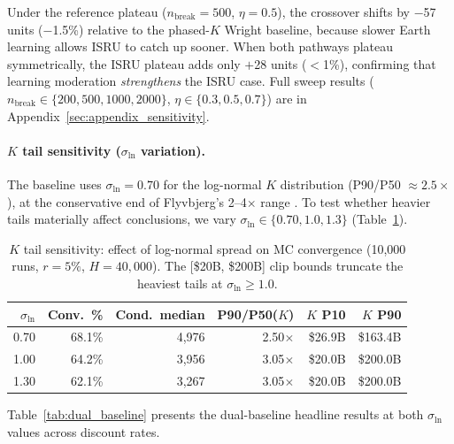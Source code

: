\documentclass[preprint,12pt]{elsarticle}
\begin{document}
Under the reference plateau ($n_{\mathrm{break}} = 500$, $\eta = 0.5$), the crossover shifts by $-$57 units ($-$1.5\%) relative to the phased-$K$ Wright baseline, because slower Earth learning allows ISRU to catch up sooner. When both pathways plateau symmetrically, the ISRU plateau adds only $+$28 units ($<$1\%), confirming that learning moderation \emph{strengthens} the ISRU case. Full sweep results ($n_{\mathrm{break}} \in \{200,500,1000,2000\}$, $\eta \in \{0.3,0.5,0.7\}$) are in Appendix~\ref{sec:appendix_sensitivity}.

\paragraph{$K$ tail sensitivity ($\sigma_{\ln}$ variation).} The baseline uses $\sigma_{\ln} = 0.70$ for the log-normal $K$ distribution (P90/P50 $\approx 2.5\times$), at the conservative end of Flyvbjerg's 2--4$\times$ range \cite{flyvbjerg2014}. To test whether heavier tails materially affect conclusions, we vary $\sigma_{\ln} \in \{0.70, 1.0, 1.3\}$ (Table~\ref{tab:sigma_ln}).

\begin{table}[htbp]
\centering
\caption{$K$ tail sensitivity: effect of log-normal spread on MC convergence (10{,}000 runs, $r = 5\%$, $H = 40{,}000$). The [\$20B, \$200B] clip bounds truncate the heaviest tails at $\sigma_{\ln} \geq 1.0$.}
\label{tab:sigma_ln}
\small
\begin{tabular}{@{}rrrrrr@{}}
\toprule
$\sigma_{\ln}$ & Conv.\ \% & Cond.\ median & P90/P50($K$) & $K$ P10 & $K$ P90 \\
\midrule
0.70 & 68.1\% & 4{,}976 & 2.50$\times$ & \$26.9B & \$163.4B \\
1.00 & 64.2\% & 3{,}956 & 3.05$\times$ & \$20.0B & \$200.0B \\
1.30 & 62.1\% & 3{,}267 & 3.05$\times$ & \$20.0B & \$200.0B \\
\bottomrule
\end{tabular}
\end{table}

Table~\ref{tab:dual_baseline} presents the dual-baseline headline results at both $\sigma_{\ln}$ values across discount rates.
\end{document}
